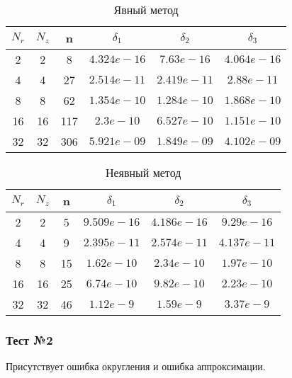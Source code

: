 \begin{table}[H]
\begin{center}
  \begin{tabular}{*{6}c}
    \toprule
    $ N_r $ & $ N_z $ & n & $ \delta_1 $ & $ \delta_2 $ & $ \delta_3 $ \\
    \midrule
    2 & 2 & 8 & $4.324e-16 $ & $7.63e-16 $ & $4.064e-16 $ \\
    4 & 4 & 27 & $2.514e-11 $ & $2.419e-11 $ & $2.88e-11 $ \\
    8 & 8 & 62 & $1.354e-10 $ & $1.284e-10 $ & $1.868e-10 $ \\
    16 & 16 & 117 & $2.3e-10 $ & $6.527e-10 $ & $1.151e-10 $ \\
    32 & 32 & 306 & $5.921e-09 $ & $1.849e-09 $ & $4.102e-09 $ \\
    \bottomrule
  \end{tabular}
  \caption{Явный метод}
\end{center}
\end{table}

\begin{table}[H]
  \begin{center}
    \begin{tabular}{*{6}c}
      \toprule
      $ N_r $ & $ N_z $ & n & $ \delta_1 $ & $ \delta_2 $ & $ \delta_3 $ \\
      \midrule
      2 & 2 & 5 & $ 9.509e-16 $ & $ 4.186e-16 $ & $ 9.29e-16 $ \\
      4 & 4 & 9 & $2.395e-11 $ & $2.574e-11 $ & $4.137e-11 $ \\
      8 & 8 & 15 & $ 1.62e-10 $ & $2.34e-10 $ & $1.97e-10 $ \\
      16 & 16 & 25 & $6.74e-10$ & $9.82e-10 $ & $2.23e-10 $ \\
      32 & 32 & 46 & $1.12e-9 $ & $1.59e-9 $ & $3.37e-9 $ \\
      \bottomrule
    \end{tabular}
    \caption{Неявный метод}
  \end{center}
\end{table}

\subsubsection*{Тест №2}

Присутствует ошибка округления и ошибка аппроксимации.

